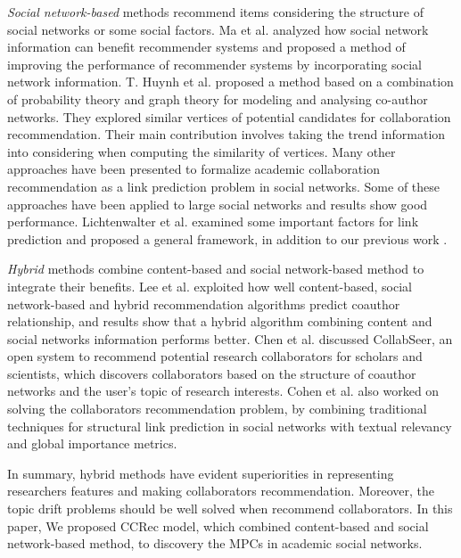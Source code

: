 \documentclass[review]{elsarticle}
\begin{document}
\emph{Social network-based} methods recommend items considering the structure of social networks or some social factors. Ma et al. \cite{ma2011recommender} analyzed how social network information can benefit recommender systems and proposed a method of improving the performance of recommender systems by incorporating social network information. T. Huynh et al. \cite{huynh2013trend} proposed a method based on a combination of probability theory and graph theory for modeling and analysing co-author networks. They explored similar vertices of potential candidates for collaboration recommendation. Their main contribution involves taking the trend information into considering when computing the similarity of vertices. Many other approaches have been presented to formalize academic collaboration recommendation as a link prediction problem \cite{chen2012discovering} \cite{sun2011co} in social networks. Some of these approaches have been applied to large social networks and results show good performance. Lichtenwalter et al. \cite{lichtenwalter2010new} examined some important factors for link prediction and proposed a general framework, in addition to our previous work \cite{li2014acrec}.

\emph{Hybrid} methods combine content-based and social network-based method to integrate their benefits. Lee et al. \cite{lee2011recommending} exploited how well content-based, social network-based and hybrid recommendation algorithms predict coauthor relationship, and results show that a hybrid algorithm combining content and social networks information performs better. Chen et al. \cite{chen2011collabseer} discussed CollabSeer, an open system to recommend potential research collaborators for scholars and scientists, which discovers collaborators based on the structure of coauthor networks and the user's topic of research interests. Cohen et al. \cite{cohen2013recommending} also worked on solving the collaborators recommendation problem, by combining traditional techniques for structural link prediction in social networks with textual relevancy and global importance metrics.

In summary, hybrid methods have evident superiorities in representing researchers features and making collaborators recommendation. Moreover, the topic drift problems should be well solved when recommend collaborators. In this paper, We proposed CCRec model, which combined content-based and social network-based method, to discovery the MPCs in academic social networks.
\end{document}
